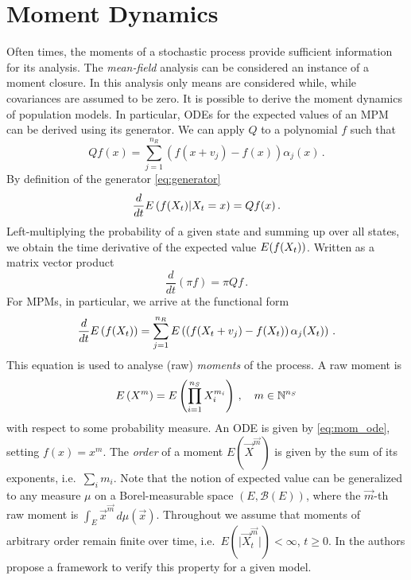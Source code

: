 \section{Moment Dynamics}\label{sec:moments_bg}
Often times, the moments of a stochastic process provide sufficient
information for its analysis.
The \emph{mean-field} analysis \parencite{bortolussi2020fluid} can be
considered an instance of a moment closure.
In this analysis only means are considered while, while covariances
are assumed to be zero.
It is possible to derive the moment dynamics of population models.
In particular, \acp{ODE} for the expected values of an \ac{MPM} can
be derived using its generator.
We can apply $Q$ to a polynomial $f$ such that
\begin{equation}\label{eq:Qf}
  Qf(x) = \sum_{j=1}^{n_R}\left(f(x+v_j) - f(x)\right)\alpha_j(x)\,.
\end{equation}
By definition of the generator \eqref{eq:generator}
\[
  \frac{d}{dt}{E}\left(f(X_t)|X_t=x\right) = Qf(x)\,.
\]
Left-multiplying the probability of a given state and summing up over
all states, we
obtain the time derivative of the expected value ${E}(f(X_t))$.
Written as a matrix vector product
\[
  \frac{d}{dt}(\pi f) = \pi Qf\,.
\]
For \acp{MPM}, in particular, we arrive at the functional form
\begin{equation}\label{eq:mom_ode}
  \frac{d}{dt}{E}\left(f({X}_t)\right) = \sum_{j=1}^{n_R}{E}\left(\left(f({X_t +
  v_j}) - f(X_t)\right)\alpha_j(X_t)\right)\,.
\end{equation}
This equation is used to analyse (raw) \emph{moments} of the process.
A raw moment is
\[{E}\left(X^{m}\right)={E}\left(\prod_{i=1}^{n_S} X_i^{m_i}\right)\,,\quad m\in {\mathbb{N}}^{n_S}\]
with respect to some probability measure.
An \ac{ODE} is given by \eqref{eq:mom_ode}, setting $f(x)=x^m$.
The \emph{order} of a moment $E({\vec X}^{\vec m})$ is given by the
sum of its exponents,
i.e.\ $\sum_i m_i$.
Note that the notion of  expected value can be generalized
to any measure $\mu$ on a Borel-measurable space
$(E, \mathcal{B}(E))$, where
the $\vec{m}$-th raw moment is $\int_E {\vec x}^{\vec m}\,d\mu(\vec x)$.
Throughout we assume that moments of arbitrary order remain finite over time,
i.e.\ $E(\lvert \vec{X}^{\vec{m}}_t\rvert)<\infty$, $t\geq 0$.
In \citet{gupta2014scalable} the authors propose a framework to verify
this property for a given model.

